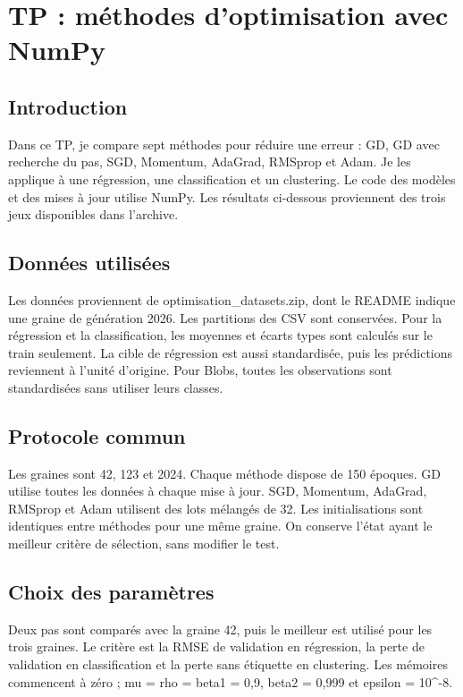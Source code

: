 \documentclass[10pt,a4paper]{article}
\begin{document}
\section*{TP : méthodes d’optimisation avec NumPy}
\subsection*{Introduction}
Dans ce TP, je compare sept méthodes pour réduire une erreur : GD, GD avec recherche du pas, SGD, Momentum, AdaGrad, RMSprop et Adam. Je les applique à une régression, une classification et un clustering. Le code des modèles et des mises à jour utilise NumPy. Les résultats ci-dessous proviennent des trois jeux disponibles dans l’archive.

\subsection*{Données utilisées}
Les données proviennent de optimisation\_datasets.zip, dont le README indique une graine de génération 2026. Les partitions des CSV sont conservées. Pour la régression et la classification, les moyennes et écarts types sont calculés sur le train seulement. La cible de régression est aussi standardisée, puis les prédictions reviennent à l’unité d’origine. Pour Blobs, toutes les observations sont standardisées sans utiliser leurs classes.

\subsection*{Protocole commun}
Les graines sont 42, 123 et 2024. Chaque méthode dispose de 150 époques. GD utilise toutes les données à chaque mise à jour. SGD, Momentum, AdaGrad, RMSprop et Adam utilisent des lots mélangés de 32. Les initialisations sont identiques entre méthodes pour une même graine. On conserve l’état ayant le meilleur critère de sélection, sans modifier le test.

\subsection*{Choix des paramètres}
Deux pas sont comparés avec la graine 42, puis le meilleur est utilisé pour les trois graines. Le critère est la RMSE de validation en régression, la perte de validation en classification et la perte sans étiquette en clustering. Les mémoires commencent à zéro ; mu = rho = beta1 = 0,9, beta2 = 0,999 et epsilon = 10\textasciicircum{}-8.
\end{document}
